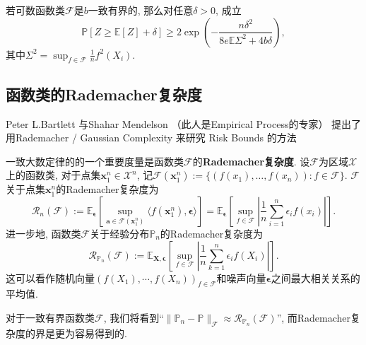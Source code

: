 \begin{theorem}[经验过程的Talagrand集中度]
	若可数函数类$\mathscr{F}$是$b$一致有界的, 那么对任意$\delta > 0$, 成立
	\begin{equation*}
		\mathbb{P}[ Z \geq \mathbb{E}[Z] + \delta] 
		\geq 2 \exp \left( - \frac{n \delta^2}{8 e \mathbb{E} \Sigma^2 + 4 b \delta} \right), 
	\end{equation*}
	其中$\Sigma^2 = \sup_{f \in \mathscr{F}} \frac1n f^2(X_i)$. 
\end{theorem}


\subsection{函数类的Rademacher复杂度}

Peter L.Bartlett 与Shahar Mendelson （此人是Empirical Process的专家） 提出了用Rademacher / Gaussian Complexity 来研究 Risk Bounds 的方法


一致大数定律的的一个重要度量是函数类$\mathscr{F}$的\textbf{Rademacher复杂度}. 
设$\mathscr{F}$为区域$\mathcal{X}$上的函数类, 对于点集$\bm{x}_1^n \in \mathcal{X}^n$, 记$\mathscr{F}(\bm{x}_1^n) := \{(f(x_1), \dots, f(x_n)) \colon f \in \mathscr{F}\}$. 
$\mathscr{F}$关于点集$\bm{x}_1^n$的Rademacher复杂度为
\begin{equation*}
	\mathcal{R}_n(\mathscr{F}) 
	:= \mathbb{E}_{\bm{\epsilon}} \left[ \sup_{\bm{a} \in \mathscr{F}(\bm{x}_1^n)} \langle f(\bm{x}_1^n), \bm{\epsilon} \rangle  \right]
	= \mathbb{E}_{\bm{\epsilon}} \left[ \sup_{f \in \mathscr{F}} \left| \frac{1}{n} \sum_{i=1}^n \epsilon_i f(x_i) \right| \right]. 
\end{equation*}
进一步地, 函数类$\mathscr{F}$关于经验分布$\mathbb{P}_n$的Rademacher复杂度为
\begin{equation*}
	\mathcal{R}_{\mathbb{P}_n}(\mathscr{F})
	:= \mathbb{E}_{\bm{X}, \bm{\epsilon}} \left[ \sup_{f \in \mathscr{F}} \left| \frac{1}{n} \sum_{k=1}^n \epsilon_i f(X_i) \right| \right]. 
\end{equation*}
这可以看作随机向量$(f(X_1), \cdots, f(X_n))_{f \in \mathscr{F}}$和噪声向量$\bm{\epsilon}$之间最大相关关系的平均值. 



对于一致有界函数类$\mathscr{F}$, 我们将看到“$\|\mathbb{P}_n - \mathbb{P}\|_{\mathscr{F}} \approx \mathcal{R}_{\mathbb{P}_n}(\mathscr{F})$”, 而Rademacher复杂度的界是更为容易得到的. 

